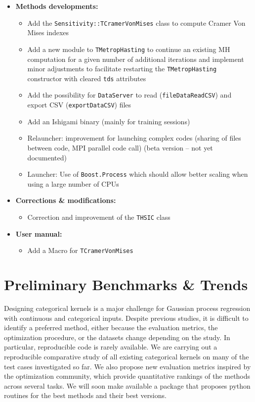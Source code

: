 \begin{itemize}
	\item \textbf{Methods developments:}
	\begin{itemize}
		\item Add the \texttt{Sensitivity::TCramerVonMises} class to compute Cramer Von Mises indexes
    	\item Add a new module to \texttt{TMetropHasting} to continue an existing MH computation for a given number of additional iterations and implement minor adjustments to facilitate restarting the \texttt{TMetropHasting} constructor with cleared \texttt{tds} attributes
    	\item Add the possibility for \texttt{DataServer} to read (\texttt{fileDataReadCSV}) and export CSV (\texttt{exportDataCSV}) files
    	\item Add an Ishigami binary (mainly for training sessions)
    	\item Relauncher: improvement for launching complex codes (sharing of files between code, MPI parallel code call) (beta version -- not yet documented)
    	\item Launcher: Use of \texttt{Boost.Process} which should allow better scaling when using a large number of CPUs
	\end{itemize}
	\item \textbf{Corrections \& modifications:}
	\begin{itemize}
		\item Correction and improvement of the \texttt{THSIC} class
	\end{itemize}
	\item \textbf{User manual:}
	\begin{itemize}
		\item Add a Macro for \texttt{TCramerVonMises}
	\end{itemize}
\end{itemize}


\section{Preliminary Benchmarks \& Trends}


Designing categorical kernels is a major challenge for Gaussian process regression with continuous and categorical inputs. Despite previous studies, it is difficult to identify a preferred method, either because the evaluation metrics,
the optimization procedure, or the datasets change depending on the study. In particular, reproducible code is rarely available. We are carrying out a reproducible comparative study of all existing categorical kernels
on many of the test cases investigated so far. We also propose new evaluation metrics inspired by the optimization
community, which provide quantitative rankings of the methods across several tasks. 
We will soon make available a package that proposes python routines for the best methods and their best versions.

